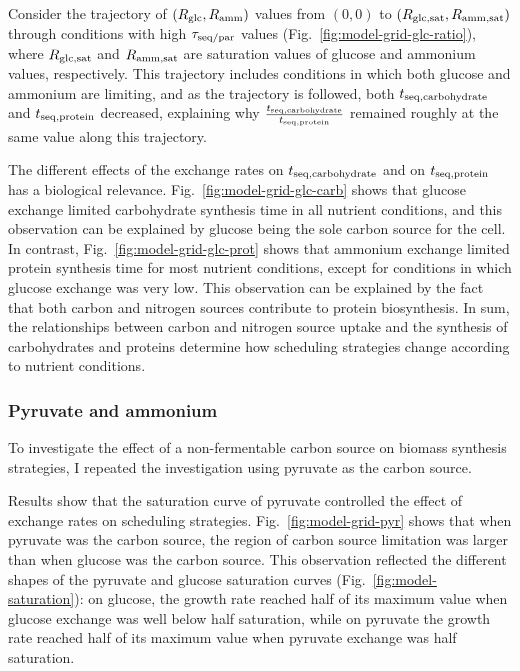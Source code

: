 Consider the trajectory of $(R_{\mathrm{glc}}, R_{\mathrm{amm}})$ values from $(0, 0)$ to $(R_{\mathrm{glc, sat}}, R_{\mathrm{amm, sat}})$ through conditions with high $\tau_{\mathrm{seq}/\mathrm{par}}$ values (Fig.\ \ref{fig:model-grid-glc-ratio}), where $R_{\mathrm{glc, sat}}$ and $R_{\mathrm{amm, sat}}$ are saturation values of glucose and ammonium values, respectively.
This trajectory includes conditions in which both glucose and ammonium are limiting, and as the trajectory is followed, both $t_{\mathrm{seq},\mathrm{carbohydrate}}$ and $t_{\mathrm{seq},\mathrm{protein}}$ decreased, explaining why $\frac{t_{\mathrm{seq},\mathrm{carbohydrate}}}{t_{\mathrm{seq},\mathrm{protein}}}$ remained roughly at the same value along this trajectory.

The different effects of the exchange rates on $t_{\mathrm{seq},\mathrm{carbohydrate}}$ and on $t_{\mathrm{seq},\mathrm{protein}}$ has a biological relevance.
Fig.\ \ref{fig:model-grid-glc-carb} shows that glucose exchange limited carbohydrate synthesis time in all nutrient conditions, and this observation can be explained by glucose being the sole carbon source for the cell.
In contrast, Fig.\ \ref{fig:model-grid-glc-prot} shows that ammonium exchange limited protein synthesis time for most nutrient conditions, except for conditions in which glucose exchange was very low.
This observation can be explained by the fact that both carbon and nitrogen sources contribute to protein biosynthesis.
In sum, the relationships between carbon and nitrogen source uptake and the synthesis of carbohydrates and proteins determine how scheduling strategies change according to nutrient conditions.


\subsubsection{Pyruvate and ammonium}
\label{subsec:model-grid-pyruvate}

To investigate the effect of a non-fermentable carbon source on biomass synthesis strategies, I repeated the investigation using pyruvate as the carbon source. %

Results show that the saturation curve of pyruvate controlled the effect of exchange rates on scheduling strategies.
Fig.\ \ref{fig:model-grid-pyr} shows that when pyruvate was the carbon source, the region of carbon source limitation was larger than when glucose was the carbon source.
This observation reflected the different shapes of the pyruvate and glucose saturation curves (Fig.\ \ref{fig:model-saturation}): on glucose, the growth rate reached half of its maximum value when glucose exchange was well below half saturation, while on pyruvate the growth rate reached half of its maximum value when pyruvate exchange was half saturation.

